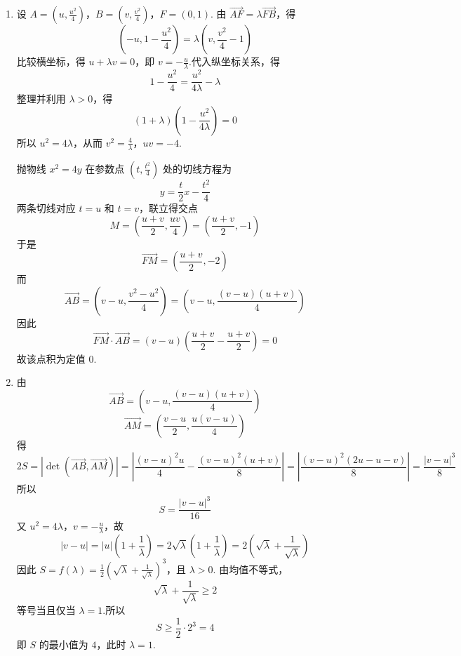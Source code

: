 \begin{solution}
\begin{enumerate}
\item 设 \(A=(u,\tfrac{u^{2}}4)\)，\(B=(v,\tfrac{v^{2}}4)\)，\(F=(0,1)\).
由 \(\overrightarrow{AF}=\lambda\overrightarrow{FB}\)，得
\[
\left(-u,1-\frac{u^{2}}4\right)
=\lambda\left(v,\frac{v^{2}}4-1\right)
\]
比较横坐标，得 \(u+\lambda v=0\)，即 \(v=-\frac{u}{\lambda}\).代入纵坐标关系，得
\[
1-\frac{u^{2}}4=\frac{u^{2}}{4\lambda}-\lambda
\]
整理并利用 \(\lambda>0\)，得
\[
(1+\lambda)\left(1-\frac{u^{2}}{4\lambda}\right)=0
\]
所以 \(u^{2}=4\lambda\)，从而 \(v^{2}=\frac4\lambda\)，\(uv=-4\).

抛物线 \(x^{2}=4y\) 在参数点 \((t,\frac{t^{2}}4)\) 处的切线方程为
\[
y=\frac t2x-\frac{t^{2}}4
\]
两条切线对应 \(t=u\) 和 \(t=v\)，联立得交点
\[
M=\left(\frac{u+v}{2},\frac{uv}{4}\right)
=\left(\frac{u+v}{2},-1\right)
\]
于是
\[
\overrightarrow{FM}=\left(\frac{u+v}{2},-2\right)
\]
而
\[
\overrightarrow{AB}
=\left(v-u,\frac{v^{2}-u^{2}}4\right)
=\left(v-u,\frac{(v-u)(u+v)}4\right)
\]
因此
\[
\overrightarrow{FM}\cdot\overrightarrow{AB}
=(v-u)\left(\frac{u+v}{2}-\frac{u+v}{2}\right)=0
\]
故该点积为定值 \(0\).

\item 由
\[
\overrightarrow{AB}
=\left(v-u,\frac{(v-u)(u+v)}4\right)
\]
\[
\overrightarrow{AM}
=\left(\frac{v-u}{2},\frac{u(v-u)}4\right)
\]
得
\[
2S=\left|\det(\overrightarrow{AB},\overrightarrow{AM})\right|
=\left|\frac{(v-u)^{2}u}{4}
-\frac{(v-u)^{2}(u+v)}8\right|
=\left|\frac{(v-u)^{2}(2u-u-v)}8\right|
=\frac{|v-u|^{3}}8
\]
所以
\[
S=\frac{|v-u|^{3}}{16}
\]
又 \(u^{2}=4\lambda\)，\(v=-\frac{u}{\lambda}\)，故
\[
|v-u|=|u|\left(1+\frac1\lambda\right)
=2\sqrt\lambda\left(1+\frac1\lambda\right)
=2\left(\sqrt\lambda+\frac1{\sqrt\lambda}\right)
\]
因此 \(S=f(\lambda)=\frac12\left(\sqrt\lambda+\frac1{\sqrt\lambda}\right)^{3}\)，且 \(\lambda>0\).
由均值不等式，
\[
\sqrt\lambda+\frac1{\sqrt\lambda}\ge2
\]
等号当且仅当 \(\lambda=1\).所以
\[
S\ge\frac12\cdot2^{3}=4
\]
即 \(S\) 的最小值为 \(4\)，此时 \(\lambda=1\).
\end{enumerate}
\end{solution}
